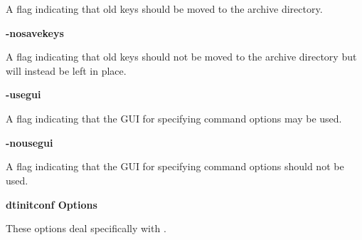 \begin{description}
A flag indicating that old keys should be moved to the archive directory.

\item {\bf -nosavekeys}\verb" "

A flag indicating that old keys should not be moved to the archive directory
but will instead be left in place.

\item {\bf -usegui}\verb" "

A flag indicating that the GUI for specifying command options may be used.

\item {\bf -nousegui}\verb" "

A flag indicating that the GUI for specifying command options should not be
used.

\end{description}

{\bf dtinitconf Options}

These options deal specifically with .

